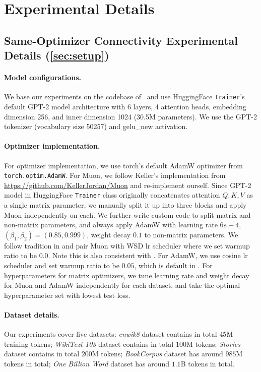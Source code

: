 \documentclass{article}
\begin{document}
\section{Experimental Details}\label{exp_appendix}

\subsection{Same-Optimizer Connectivity Experimental Details (\cref{sec:setup})}\label{observation_appendix}

\paragraph{Model configurations.} We base our experiments on the codebase of~\citet{theus2025generalizedlinearmodeconnectivity} and use HuggingFace \texttt{Trainer}'s default GPT-2 model architecture with 6 layers, 4 attention heads, embedding dimension 256, and inner dimension 1024 (30.5M parameters). We use the GPT-2 tokenizer (vocabulary size 50257) and gelu\_new activation.

\paragraph{Optimizer implementation.} For optimizer implementation, we use torch's default AdamW optimizer from \texttt{torch.optim.AdamW}. For Muon, we follow Keller's implementation from \url{https://github.com/KellerJordan/Muon} and re-implement ourself. Since GPT-2 model in HuggingFace \texttt{Trainer} class originally concatenates attention $Q,K,V$ as a single matrix parameter, we manually split it up into three blocks and apply Muon independently on each. We further write custom code to split matrix and non-matrix parameters, and always apply AdamW with learning rate $6e-4$, $(\beta_1,\beta_2)=(0.85,0.999)$, weight decay $0.1$ to non-matrix parameters. We follow tradition in \citep{jordan2024muon} and pair Muon with WSD lr scheduler where we set warmup ratio to be $0.0$. Note this is also consistent with \citep{wen2025fantasticpretrainingoptimizers}. For AdamW, we use cosine lr scheduler and set warmup ratio to be $0.05$, which is default in \citep{theus2025generalizedlinearmodeconnectivity}. For hyperparameters for matrix optimizers, we tune learning rate and weight decay for Muon and AdamW independently for each dataset, and take the optimal hyperparameter set with lowest test loss.
\paragraph{Dataset details.} Our experiments cover five datasets: \emph{enwik8} dataset \citep{enwik8} contains in total $45$M training tokens; \emph{WikiText-103} dataset \citep{merity2016pointersentinelmixturemodels} contains in total $100$M tokens; \emph{Stories} dataset \citep{trinh2019simplemethodcommonsensereasoning} contains in total $200$M tokens; \emph{BookCorpus} dataset \citep{zhu2015aligningbooksmoviesstorylike} has around $985$M tokens in total; \emph{One Billion Word} dataset \citep{chelba2014billionwordbenchmarkmeasuring} has around $1.1$B tokens in total.
\end{document}
